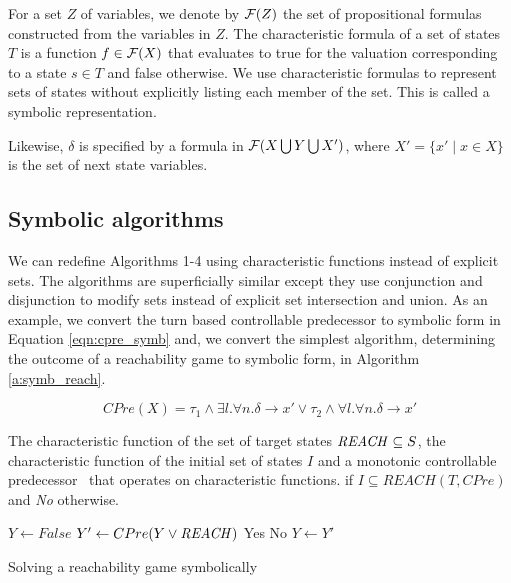 For a set $Z$ of variables, we denote by $\mathcal{F}(Z)$ the set of propositional formulas constructed from the variables in $Z$. The characteristic formula of a set of states $T$ is a function $f \in \mathcal{F}(X)$ that evaluates to true for the valuation corresponding to a state $s \in T$ and false otherwise. We use characteristic formulas to represent sets of states without explicitly listing each member of the set. This is called a symbolic representation.

Likewise, $\delta$ is specified by a formula in $\mathcal{F}(X \bigcup Y \bigcup X')$, where $X' = \{x' \mid x \in X \}$ is the set of next state variables.

\subsection{Symbolic algorithms}

We can redefine Algorithms 1-4 using characteristic functions instead of explicit sets. The algorithms are superficially similar except they use conjunction and disjunction to modify sets instead of explicit set intersection and union. As an example, we convert the turn based controllable predecessor to symbolic form in Equation \ref{eqn:cpre_symb} and, we convert the simplest algorithm, determining the outcome of a reachability game to symbolic form, in Algorithm \ref{a:symb_reach}.

\begin{equation}
CPre(X) = \tau_1 \wedge \exists l. \forall n. \delta \rightarrow x' \vee \tau_2 \wedge \forall l. \forall n. \delta \rightarrow x' 
\label{eqn:cpre_symb}
\end{equation}

\begin{algorithm}
\begin{algorithmic}

\Require The characteristic function of the set of target states $\mathit{REACH} \subseteq S$, the characteristic function of the initial set of states $I$ and a monotonic controllable predecessor \cpre\ that operates on characteristic functions.
 if $I \subseteq REACH(T, CPre)$ and {\it No} otherwise.

    \State $Y \gets False$
    \Loop
        \State $Y' \gets CPre(Y \vee \mathit{REACH})$
                \State\Return Yes
            \Else
                \State\Return No
            \EndIf
        \EndIf
        \State $Y \gets Y'$
    \EndLoop
\EndFunction

\end{algorithmic}
\caption{Solving a reachability game symbolically}
\label{a:symb_reach}
\end{algorithm}

